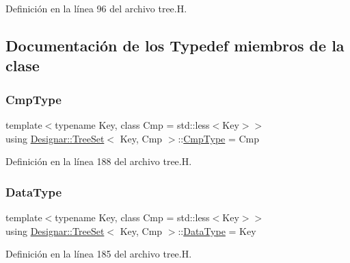 Definición en la línea 96 del archivo tree.\+H.



\subsection{Documentación de los \textquotesingle{}Typedef\textquotesingle{} miembros de la clase}
\mbox{\label{class_designar_1_1_tree_set_a556e79c8fffe1f172a60848942672fa7}} 
\subsubsection{\texorpdfstring{Cmp\+Type}{CmpType}}
{\footnotesize\ttfamily template$<$typename Key, class Cmp = std\+::less$<$\+Key$>$$>$ \\
using \hyperlink{class_designar_1_1_tree_set}{Designar\+::\+Tree\+Set}$<$ Key, Cmp $>$\+::\hyperlink{class_designar_1_1_tree_set_a556e79c8fffe1f172a60848942672fa7}{Cmp\+Type} =  Cmp}



Definición en la línea 188 del archivo tree.\+H.

\mbox{\label{class_designar_1_1_tree_set_a14a0b2c4c9e4db09003126217094bfe8}} 
\subsubsection{\texorpdfstring{Data\+Type}{DataType}}
{\footnotesize\ttfamily template$<$typename Key, class Cmp = std\+::less$<$\+Key$>$$>$ \\
using \hyperlink{class_designar_1_1_tree_set}{Designar\+::\+Tree\+Set}$<$ Key, Cmp $>$\+::\hyperlink{class_designar_1_1_tree_set_a14a0b2c4c9e4db09003126217094bfe8}{Data\+Type} =  Key}



Definición en la línea 185 del archivo tree.\+H.

\mbox{\label{class_designar_1_1_tree_set_a3d4237612f151579b02ff5c7735df07a}} 
